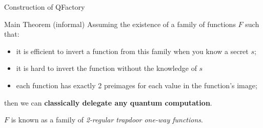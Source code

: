 \documentclass[]{beamer}
\begin{document}
\begin{frame}{Construction of QFactory}
  \begin{block}{Main Theorem (informal)}
    Assuming the existence of a family of functions $F$ such that:
    \begin{itemize}
    \item it is efficient to invert a function from this family when you know a secret $s$;
    \item it is hard to invert the function without the knowledge of $s$
    \item each function has exactly 2 preimages for each value in the function's image;
    \end{itemize}
    then we can \textbf{classically delegate any quantum computation}.
  
    $F$ is known as a family of \textit{2-regular trapdoor one-way functions}. \\
    
  \end{block}
\end{frame}
\end{document}
